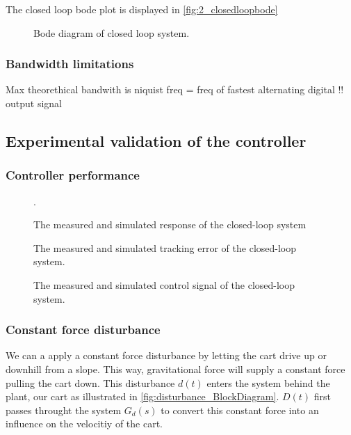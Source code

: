 \documentclass[a4paper]{article}
\newcommand{\newpar}{\vspace{.3cm}\noindent}
\begin{document}
\newpar
The closed loop bode plot is displayed in \autoref{fig:2_closedloopbode}

\begin{figure}[H]
    \caption{Bode diagram of closed loop system.}
    \label{fig:2_closedloopbode}
\end{figure}

\subsubsection{Bandwidth limitations}
Max theorethical bandwith is niquist freq = freq of fastest alternating digital !! output signal 


\subsection{Experimental validation of the controller}
\subsubsection{Controller performance}

\begin{figure}[H]
    \caption{The measured and simulated response of the closed-loop system}.
    \label{fig:closed_loop_response}
\end{figure}

\begin{figure}[H]
    \caption{The measured and simulated tracking error of the closed-loop system.}
    \label{fig:tracking_error}
\end{figure}

\begin{figure}[H]
    \caption{The measured and simulated control signal of the closed-loop system.}
    \label{fig:control_signal}
\end{figure}

\subsubsection{Constant force disturbance}
We can a apply a constant force disturbance by letting the cart drive up or downhill from a slope. This way, gravitational force will supply a constant force pulling the cart down. This disturbance $d(t)$ enters the system behind the plant, our cart as illustrated in \autoref{fig:disturbance_BlockDiagram}. $D(t)$ first passes throught the system $G_d(s)$ to convert this constant force into an influence on the velocitiy of the cart. 
\end{document}
